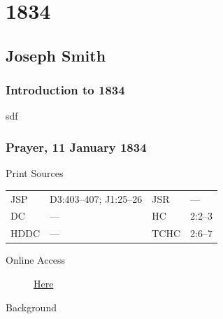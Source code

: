 \section{1834}
	\label{EMS-1834}
	
	\subsection{Joseph Smith}
		\label{EMS-1834-JS}

		\subsubsection{Introduction to 1834}
		
			sdf
		
		\subsubsection{Prayer, 11 January 1834}
			\label{EMS-1834-JS-11-JAN-1834}
			
			\begin{description}
					\item[Print Sources]
				\end{description}

					\begin{tabular}{p{0.5in}p{1in}p{0.5in}p{1in}}
					JSP	 	& D3:403--407; J1:25--26		& JSR 		& --- \\
					DC	 	& --- 				& HC 		& 2:2--3 \\
					HDDC 	& ---				& TCHC 		& 2:6--7 \\
					\end{tabular}
				
				\begin{description}
					\item[Online Access] \href{https://www.josephsmithpapers.org/paper-summary/prayer-11-january-1834/}{Here}
				\end{description}
				
				\begin{description}
					\item[Background]
				\end{description}
				
